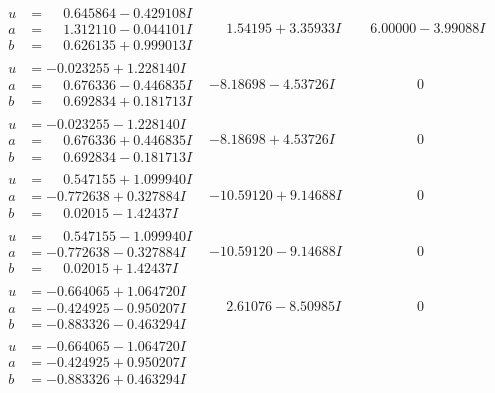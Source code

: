 \documentclass[1p]{elsarticle_modified}
\theoremstyle{definition}
\begin{document}
$$\begin{array}{c|c|c}
\begin{aligned}
u &= \phantom{-}0.645864 - 0.429108 I \\
a &= \phantom{-}1.312110 - 0.044101 I \\
b &= \phantom{-}0.626135 + 0.999013 I\end{aligned}
 & \phantom{-}1.54195 + 3.35933 I & \phantom{-}6.00000 - 3.99088 I \\ \hline\begin{aligned}
u &= -0.023255 + 1.228140 I \\
a &= \phantom{-}0.676336 - 0.446835 I \\
b &= \phantom{-}0.692834 + 0.181713 I\end{aligned}
 & -8.18698 - 4.53726 I & \phantom{-0.000000 } 0 \\ \hline\begin{aligned}
u &= -0.023255 - 1.228140 I \\
a &= \phantom{-}0.676336 + 0.446835 I \\
b &= \phantom{-}0.692834 - 0.181713 I\end{aligned}
 & -8.18698 + 4.53726 I & \phantom{-0.000000 } 0 \\ \hline\begin{aligned}
u &= \phantom{-}0.547155 + 1.099940 I \\
a &= -0.772638 + 0.327884 I \\
b &= \phantom{-}0.02015 - 1.42437 I\end{aligned}
 & -10.59120 + 9.14688 I & \phantom{-0.000000 } 0 \\ \hline\begin{aligned}
u &= \phantom{-}0.547155 - 1.099940 I \\
a &= -0.772638 - 0.327884 I \\
b &= \phantom{-}0.02015 + 1.42437 I\end{aligned}
 & -10.59120 - 9.14688 I & \phantom{-0.000000 } 0 \\ \hline\begin{aligned}
u &= -0.664065 + 1.064720 I \\
a &= -0.424925 - 0.950207 I \\
b &= -0.883326 - 0.463294 I\end{aligned}
 & \phantom{-}2.61076 - 8.50985 I & \phantom{-0.000000 } 0 \\ \hline\begin{aligned}
u &= -0.664065 - 1.064720 I \\
a &= -0.424925 + 0.950207 I \\
b &= -0.883326 + 0.463294 I\end{aligned}

\end{array}$$
\end{document}
